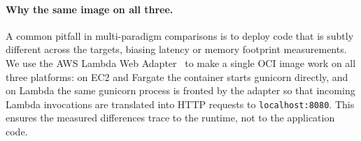 \paragraph{Why the same image on all three.} A common pitfall in
multi-paradigm comparisons is to deploy code that is subtly different
across the targets, biasing latency or memory footprint measurements.
We use the AWS Lambda Web Adapter~\cite{lambda-web-adapter} to make a
single OCI image work on all three platforms: on EC2 and Fargate the
container starts gunicorn directly, and on Lambda the same gunicorn
process is fronted by the adapter so that incoming Lambda invocations
are translated into HTTP requests to \texttt{localhost:8080}. This
ensures the measured differences trace to the runtime, not to the
application code.
